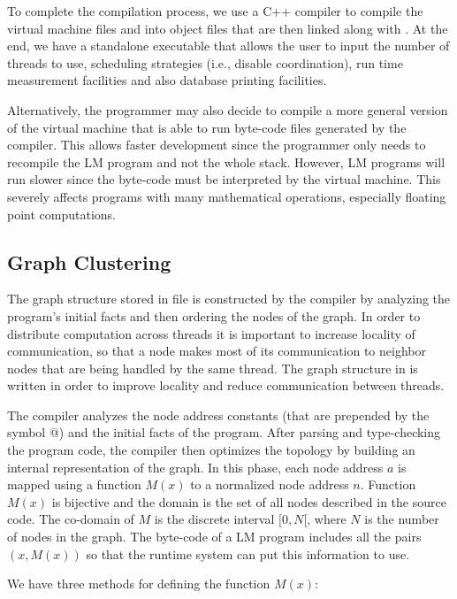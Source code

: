 To complete the compilation process, we use a C++ compiler to compile the
virtual machine files and  into object files that are then
linked along with . At the end, we have a standalone
executable that allows the user to input the number of threads to use,
scheduling strategies (i.e., disable coordination), run time measurement
facilities and also database printing facilities.

Alternatively, the programmer may also decide to compile a more general version
of the virtual machine that is able to run byte-code files generated by the
compiler. This allows faster development since the programmer only needs to
recompile the LM program and not the whole stack. However, LM programs will run
slower since the byte-code must be interpreted by the virtual machine. This
severely affects programs with many mathematical operations, especially floating
point computations.

\iffalse
\subsection{Graph Clustering}

The graph structure stored in file  is constructed by the
compiler by analyzing the program's initial facts and then ordering the nodes of
the graph.  In order to distribute computation across threads it is important to
increase locality of communication, so that a node makes most of its
communication to neighbor nodes that are being handled by the same thread. The
graph structure in  is written in order to improve locality and
reduce communication between threads.

The compiler analyzes the node address constants (that are prepended by the
symbol @) and the initial facts of the program. After parsing and type-checking the
program code, the compiler then optimizes the topology by building an internal
representation of the graph.  In this phase, each node address $a$ is mapped
using a function $M(x)$ to a normalized node address $n$. Function $M(x)$ is
bijective and the domain is the set of all nodes described in the source code.
The co-domain of $M$ is the discrete interval $[0, N[$, where $N$ is the number
of nodes in the graph. The byte-code of a LM program includes all the pairs $(x,
M(x))$ so that the runtime system can put this information to use.

We have three methods for defining the function $M(x)$:

